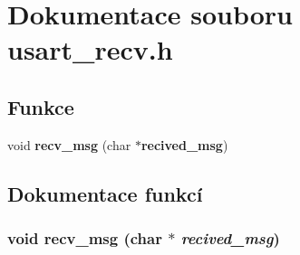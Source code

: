 \section{Dokumentace souboru usart\_\-recv.h}
\label{usart__recv_8h}
\subsection*{Funkce}
\begin{CompactItemize}
\item 
void {\bf recv\_\-msg} (char $\ast${\bf recived\_\-msg})
\end{CompactItemize}


\subsection{Dokumentace funkcí}
\subsubsection{\setlength{\rightskip}{0pt plus 5cm}void recv\_\-msg (char $\ast$ {\em recived\_\-msg})}\label{usart__recv_8h_8c511fa0fa24a5d675b8142ffc483ecb}


